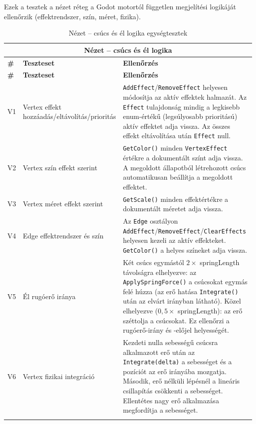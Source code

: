 Ezek a tesztek a nézet réteg a Godot motortól független megjelítési logikáját ellenőrzik (effektrendszer, szín, méret, fizika).
\begin{center}
\begin{longtable}{ | p{} | p{} | p{} | }

\hline
\multicolumn{3}{|c|}{\textbf{Nézet – csúcs és él logika}}
\\ \hline
\textbf{\#} & \textbf{Teszteset} & \textbf{Ellenőrzés}
\\ \hline \hline
\endfirsthead

\hline
\textbf{\#} & \textbf{Teszteset} & \textbf{Ellenőrzés}
\\ \hline \hline
\endhead

\hline
\endfoot
\endlastfoot

V1
& Vertex effekt hozzáadás/eltávolítás/prioritás
& \texttt{AddEffect}/\texttt{RemoveEffect} helyesen módosítja az aktív effektek halmazát. Az \texttt{Effect} tulajdonság mindig a legkisebb enum-értékű (legsúlyosabb prioritású) aktív effektet adja vissza. Az összes effekt eltávolítása után \texttt{Effect} null.
\\ \hline

V2
& Vertex szín effekt szerint
& \texttt{GetColor()} minden \texttt{VertexEffect} értékre a dokumentált színt adja vissza. A megoldott állapotból létrehozott csúcs automatikusan beállítja a megoldott effektet.
\\ \hline

V3
& Vertex méret effekt szerint
& \texttt{GetScale()} minden effektértékre a dokumentált méretet adja vissza.
\\ \hline

V4
& Edge effektrendszer és szín
& Az \texttt{Edge} osztályon \texttt{AddEffect}/\texttt{RemoveEffect}/\texttt{ClearEffects} helyesen kezeli az aktív effekteket. \texttt{GetColor()} a helyes színeket adja vissza.
\\ \hline

V5
& Él rugóerő iránya
& Két csúcs egymástól $2 \times$ springLength távolságra elhelyezve: az \texttt{ApplySpringForce()} a csúcsokat egymás felé húzza (az erő hatása \texttt{Integrate()} után az elvárt irányban látható). Közel elhelyezve ($0{,}5 \times$ springLength): az erő széttolja a csúcsokat. Ez ellenőrzi a rugóerő-irány és -előjel helyességét.
\\ \hline

V6
& Vertex fizikai integráció
& Kezdeti nulla sebességű csúcsra alkalmazott erő után az \texttt{Integrate(delta)} a sebességet és a pozíciót az erő irányába mozgatja. Második, erő nélküli lépésnél a lineáris csillapítás csökkenti a sebességet. Ellentétes nagy erő alkalmazása megfordítja a sebességet.
\\ \hline

\caption{Nézet – csúcs és él logika egységtesztek}
\label{tab:ut-view}
\end{longtable}
\end{center}

